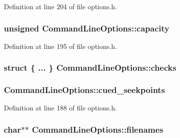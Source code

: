 Definition at line 204 of file options.\+h.

\subsubsection[{\texorpdfstring{capacity}{capacity}}]{\setlength{\rightskip}{0pt plus 5cm}unsigned Command\+Line\+Options\+::capacity}\hypertarget{struct_command_line_options_a50e3aed165186ba10f33bb6d6a341f82}{}\label{struct_command_line_options_a50e3aed165186ba10f33bb6d6a341f82}


Definition at line 195 of file options.\+h.

\subsubsection[{\texorpdfstring{checks}{checks}}]{\setlength{\rightskip}{0pt plus 5cm}struct \{ ... \}   Command\+Line\+Options\+::checks}\hypertarget{struct_command_line_options_a1e36749dd9ea7ec7671d712460a915c5}{}\label{struct_command_line_options_a1e36749dd9ea7ec7671d712460a915c5}
\subsubsection[{\texorpdfstring{cued\+\_\+seekpoints}{cued_seekpoints}}]{ Command\+Line\+Options\+::cued\+\_\+seekpoints}\hypertarget{struct_command_line_options_aca486ada1f981583a0f9c3ed8614e80b}{}\label{struct_command_line_options_aca486ada1f981583a0f9c3ed8614e80b}


Definition at line 188 of file options.\+h.

\subsubsection[{\texorpdfstring{filenames}{filenames}}]{\setlength{\rightskip}{0pt plus 5cm}char$\ast$$\ast$ Command\+Line\+Options\+::filenames}\hypertarget{struct_command_line_options_acffa4e5aac605340ba7ce98d9d144562}{}\label{struct_command_line_options_acffa4e5aac605340ba7ce98d9d144562}


